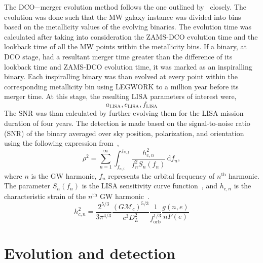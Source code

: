 \documentclass[journal, twocolumns]{IEEEtran}
\newcommand{\semaxis}[1]{a_{\text{#1}}}
\newcommand{\ecc}[1]{e_\text{#1}}
\begin{document}
    The DCO$-$merger evolution method follows the one outlined by~\cite{Wagg2021} closely.
    The evolution was done such that the MW galaxy instance was divided into bins based on the metallicity values of the evolving binaries.
    The evolution time was calculated after taking into consideration the ZAMS-DCO evolution time and the lookback time of all the MW points within the metallicity bins.
    If a binary, at DCO stage, had a resultant merger time greater than the difference of its lookback time and ZAMS-DCO evolution time, it was marked as an inspiralling binary.
    Each inspiralling binary was than evolved at every point within the corresponding metallicity bin using LEGWORK to a million year before its merger time.
    At this stage, the resulting LISA parameters of interest were,
    \begin{equation}%
        \semaxis{LISA}, \ecc{LISA}, f_{\text{LISA}}
        \label{eq:lisa_parameter_names}
    \end{equation}%
    The SNR was than calculated by further evolving them for the LISA mission duration of four years.
    The detection is made based on the signal-to-noise ratio (SNR) of the binary averaged over sky position, polarization, and orientation using the following expression from~\cite{Finn2000},
    \begin{equation}
        \rho^2 = \sum_{n=1}^{\infty}\int_{f_{n, i}}^{f_{n, f}}\frac{h_{c, n}^2}{f_n^2 S_n(f_n)}\,\text{d}f_n,
        \label{eq:snr_equation}
    \end{equation}
    where $n$ is the GW harmonic, $f_n$ represents the orbital frequency of $n^\text{th}$ harmonic.
    The parameter $S_n(f_n)$ is the LISA sensitivity curve function~\cite{Robson2019}, and $h_{c, n}$ is the characteristic strain of the $n^\text{th}$ GW harmonic~\cite{Barack2004}.
    \begin{equation}
        h_{c,n}^2 = \frac{2^{5/3}}{3\pi^{4/3}}\frac{(G\mathcal{M}_c)^{5/3}}{c^3 D_L^2}\frac{1}{f_\text{orb}^{1/3}}\frac{g(n, e)}{nF(e)}
        \label{eq:characteristic_strain}
    \end{equation}


    \section{Evolution and detection}
    \label{sec:evolution-and-detection}
\end{document}
